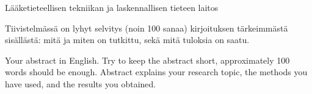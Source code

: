 \documentclass[english,12pt,a4paper,dvips]{article}
\begin{document}

%
{Lääketieteellisen tekniikan ja laskennallisen tieteen laitos}



\author{Matleena Kukkonen\\84673L}


\date{24.6.2015}




\makecoverpage



\begin{abstractpage}[finnish]
  Tiivistelmässä on lyhyt selvitys (noin 100 sanaa)
  kirjoituksen tärkeimmästä sisällästä: mitä ja miten on tutkittu,
  sekä mitä tuloksia on saatu. 
\end{abstractpage}

\newpage
%
\begin{abstractpage}[english]
 Your abstract in English. Try to keep the abstract short, approximately 
 100 words should be enough. Abstract explains your research topic, 
 the methods you have used, and the results you obtained.  
\end{abstractpage}
\end{document}
